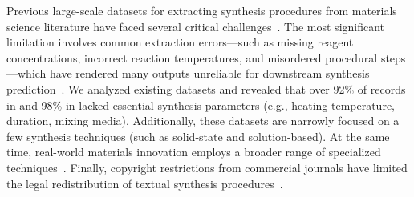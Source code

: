 

Previous large-scale datasets for extracting synthesis procedures from materials science literature have faced several critical challenges~\cite{kononova2019text,wang2022dataset}. The most significant limitation involves common extraction errors—such as missing reagent concentrations, incorrect reaction temperatures, and misordered procedural steps—which have rendered many outputs unreliable for downstream synthesis prediction~\cite{sun2025critical}. We analyzed existing datasets and revealed that over 92\% of records in \citeauthor{kononova2019text} and 98\% in \citeauthor{wang2022dataset} lacked essential synthesis parameters (e.g., heating temperature, duration, mixing media). Additionally, these datasets are narrowly focused on a few synthesis techniques (such as solid-state and solution-based). At the same time, real-world materials innovation employs a broader range of specialized techniques~\cite{xu2023small}. Finally, copyright restrictions from commercial journals have limited the legal redistribution of textual synthesis procedures~\cite{authorsalliance2024tdm}.

